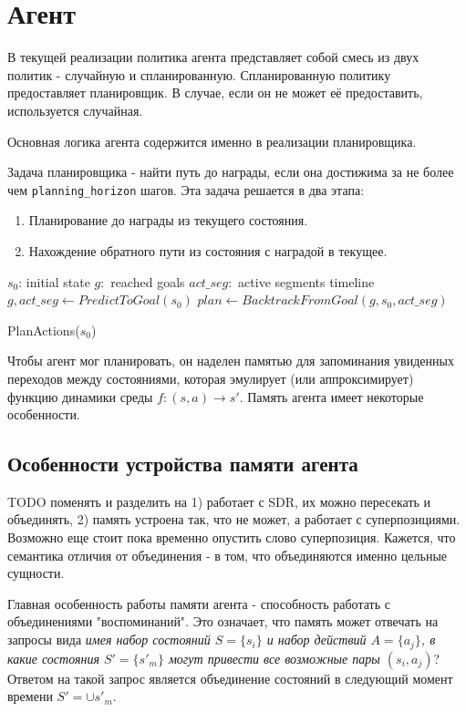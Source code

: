\documentclass[a4paper]{article}
\begin{document}
\section{Агент}

В текущей реализации политика агента представляет собой смесь из двух политик - случайную и спланированную. Спланированную политику предоставляет планировщик. В случае, если он не может её предоставить, используется случайная.

Основная логика агента содержится именно в реализации планировщика.

Задача планировщика - найти путь до награды, если она достижима за не более чем \verb|planning_horizon| шагов. Эта задача решается в два этапа:

\begin{enumerate}
    \item Планирование до награды из текущего состояния.
    \item Нахождение обратного пути из состояния с наградой в текущее.
\end{enumerate}

\begin{function}
  \SetAlgoNoLine
  $s_0$: initial state \;
  $g: $ reached goals \;
  $act\_seg: $ active segments timeline \;
  \quad \\

  $g, act\_seg \leftarrow PredictToGoal(s_0)$ \;
  $plan \leftarrow BacktrackFromGoal(g, s_0, act\_seg)$ \;

  \caption{PlanActions($s_0$)}
\end{function}

Чтобы агент мог планировать, он наделен памятью для запоминания увиденных переходов между состояниями, которая эмулирует (или аппроксимирует) функцию динамики среды $f: (s, a) \rightarrow s'$. Память агента имеет некоторые особенности.

\subsection{Особенности устройства памяти агента}

TODO поменять и разделить на 1) работает с SDR, их можно пересекать и объединять, 2) память устроена так, что не может, а работает с суперпозициями. Возможно еще стоит пока временно опустить слово суперпозиция. Кажется, что семантика отличия от объединения - в том, что объединяются именно цельные сущности.

Главная особенность работы памяти агента - способность работать с объединениями "воспоминаний". Это означает, что память может отвечать на запросы вида \textit{имея набор состояний $S=\{s_i\}$ и набор действий $A=\{a_j\}$, в какие состояния $S'=\{s'_m\}$ могут привести все возможные пары $(s_i, a_j)$}? Ответом на такой запрос является объединение состояний в следующий момент времени $S' = \cup s'_m$.
\end{document}
